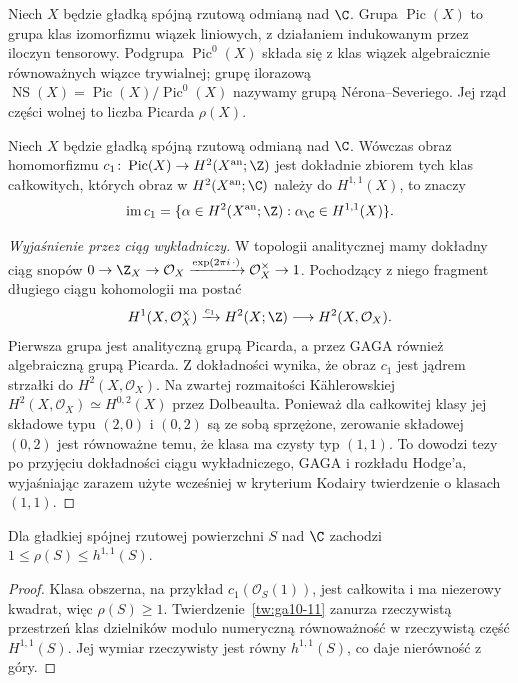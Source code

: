 \begin{definicja}
Niech $X$ będzie gładką spójną rzutową odmianą nad $\C$.
Grupa $\operatorname{Pic}(X)$ to grupa klas izomorfizmu
wiązek liniowych, z działaniem indukowanym przez iloczyn tensorowy.
Podgrupa $\operatorname{Pic}^0(X)$ składa się z klas
wiązek algebraicznie równoważnych wiązce trywialnej;
grupę ilorazową
$\operatorname{NS}(X)=\operatorname{Pic}(X)/\operatorname{Pic}^0(X)$
nazywamy grupą Nérona--Severiego.
Jej rząd części wolnej to liczba Picarda $\rho(X)$.
\end{definicja}

\begin{twierdzenie}
\label{tw:ga10-11}
Niech $X$ będzie gładką spójną rzutową odmianą nad $\C$.
Wówczas obraz homomorfizmu
$c_1\colon\operatorname{Pic}(X)\to H^2(X^{\rm an};\Z)$
jest dokładnie zbiorem tych klas całkowitych,
których obraz w $H^2(X^{\rm an};\C)$ należy do
$H^{1,1}(X)$, to znaczy
\[
 \operatorname{im}c_1
 =\{\alpha\in H^2(X^{\rm an};\Z):
 \alpha_{\C}\in H^{1,1}(X)\}.
\]
\end{twierdzenie}

\begin{proof}[Wyjaśnienie przez ciąg wykładniczy]
W topologii analitycznej mamy dokładny ciąg snopów
$0\to\Z_X\to\mathcal O_X\xrightarrow{\exp(2\pi i\,\cdot)}
\mathcal O_X^{\times}\to1$.
Pochodzący z niego fragment długiego ciągu kohomologii
ma postać
\[
 H^1(X,\mathcal O_X^{\times})\xrightarrow{c_1}
 H^2(X;\Z)\longrightarrow H^2(X,\mathcal O_X).
\]
Pierwsza grupa jest analityczną grupą Picarda,
a przez GAGA również algebraiczną grupą Picarda.
Z dokładności wynika, że obraz $c_1$ jest jądrem
strzałki do $H^2(X,\mathcal O_X)$.
Na zwartej rozmaitości Kählerowskiej
$H^2(X,\mathcal O_X)\simeq H^{0,2}(X)$ przez Dolbeaulta.
Ponieważ dla całkowitej klasy jej składowe typu $(2,0)$
i $(0,2)$ są ze sobą sprzężone, zerowanie składowej
$(0,2)$ jest równoważne temu, że klasa ma czysty typ $(1,1)$.
To dowodzi tezy po przyjęciu dokładności ciągu wykładniczego,
GAGA i rozkładu Hodge'a, wyjaśniając zarazem użyte wcześniej
w kryterium Kodairy twierdzenie o klasach $(1,1)$.
\end{proof}

\begin{wniosek}
\label{wn:ga10-rho}
Dla gładkiej spójnej rzutowej powierzchni $S$ nad $\C$
zachodzi $1\le\rho(S)\le h^{1,1}(S)$.
\end{wniosek}
\begin{proof}
Klasa obszerna, na przykład $c_1(\mathcal O_S(1))$,
jest całkowita i ma niezerowy kwadrat, więc
$\rho(S)\ge1$.
Twierdzenie~\ref{tw:ga10-11} zanurza rzeczywistą
przestrzeń klas dzielników modulo numeryczną równoważność
w rzeczywistą część $H^{1,1}(S)$.
Jej wymiar rzeczywisty jest równy $h^{1,1}(S)$,
co daje nierówność z góry.
\end{proof}

